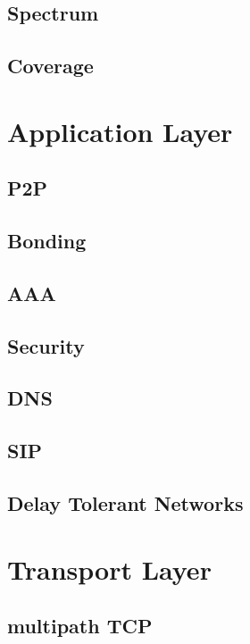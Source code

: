 \documentclass[journal]{IEEEtran}
\begin{document}
\subsection{Spectrum}

\subsection{Coverage}

\section{Application Layer}
\subsection{P2P}
\subsection{Bonding}
\subsection{AAA}
\subsection{Security}
\subsection{DNS}
\subsection{SIP}
\subsection{Delay Tolerant Networks}

\section{Transport Layer}
\subsection{ multipath TCP }
\end{document}
